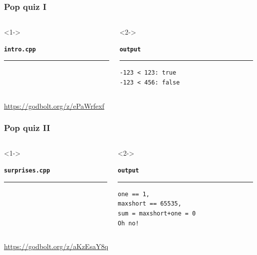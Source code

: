 \documentclass[aspectratio=169]{beamer}
\begin{document}
\begin{frame}[fragile]
\frametitle{Pop quiz I}
\begin{columns}[T]
  \begin{column}{0.7\textwidth}<1->
    {\color[HTML]{cb4b16}
    \texttt{\textbf{intro.cpp}}\vspace{-9pt}
    \rule{\linewidth}{2pt}}%
    {\fontsize{8}{6} }%
    \vspace{-12pt}{\color[HTML]{cb4b16}\rule{\linewidth}{2pt}}%
  \end{column}
  \begin{column}{0.25\textwidth}<2->
    {\color[HTML]{002b36}
    \texttt{\textbf{output}}\vspace{-9pt}
    \rule{\linewidth}{2pt}}%
    {\fontsize{8}{6} \begin{lstlisting}[showstringspaces=false]
-123 < 123: true
-123 < 456: false
    \end{lstlisting}
    }
    \vspace{-12pt}{\color[HTML]{002b36}\rule{\linewidth}{2pt}}%
  \end{column}
\end{columns}
\pause{}
\begin{center}\url{https://godbolt.org/z/ePaWrfexf}\end{center}
\end{frame}


\begin{frame}[fragile]
\frametitle{Pop quiz II}
\begin{columns}[T]
  \begin{column}{0.7\textwidth}<1->
    {\color[HTML]{cb4b16}
    \texttt{\textbf{surprises.cpp}}\vspace{-9pt}
    \rule{\linewidth}{2pt}}%
    {\fontsize{8}{6} }%
    \vspace{-12pt}{\color[HTML]{cb4b16}\rule{\linewidth}{2pt}}%
  \end{column}
  \begin{column}{0.25\textwidth}<2->
    {\color[HTML]{002b36}
    \texttt{\textbf{output}}\vspace{-9pt}
    \rule{\linewidth}{2pt}}%
    {\fontsize{8}{6} \begin{lstlisting}[showstringspaces=false]
one == 1,
maxshort == 65535,
sum = maxshort+one = 0
Oh no!
    \end{lstlisting}
    }
    \vspace{-12pt}{\color[HTML]{002b36}\rule{\linewidth}{2pt}}%
  \end{column}
\end{columns}
\pause{}
\begin{center}\url{https://godbolt.org/z/aKzEsaY8q}\end{center}
\end{frame}
\end{document}
